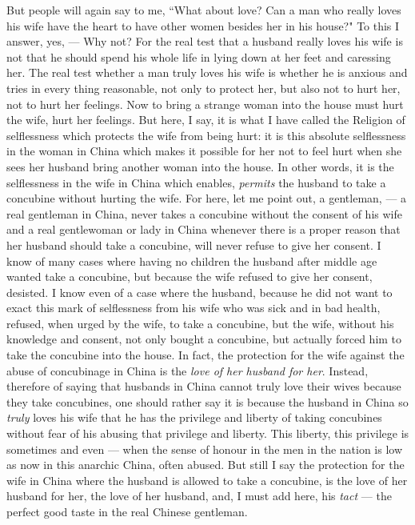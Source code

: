 But people will again say to me, ``What about love? Can a man who really loves his wife have the heart to have other women besides her in his house?"
To this I answer, yes, --- Why not? 
For the real test that a husband really loves his wife is not that he should spend his whole life in lying down at her feet and caressing her.
The real test whether a man truly loves his wife is whether he is anxious and tries in every thing reasonable, not only to protect her, but also not to hurt her, not to hurt her feelings.
Now to bring a strange woman into the house must hurt the wife, hurt her feelings.
But here, I say, it is what I have called the Religion of selflessness which protects the wife from being hurt: it is this absolute selflessness in the woman in China which makes it possible for her not to feel hurt when she sees her husband bring another woman into the house.
In other words, it is the selflessness in the wife in China which enables, \emph{permits} the husband to take a concubine without hurting the wife.
For here, let me point out, a gentleman, --- a real gentleman in China, never takes a concubine without the consent of his wife and a real gentlewoman or lady in China whenever there is a proper reason that her husband should take a concubine, will never refuse to give her consent.
I know of many cases where having no children the husband after middle age wanted take a concubine, but because the wife refused to give her consent, desisted.
I know even of a case where the husband, because he did not want to exact this mark of selflessness from his wife who was sick and in bad health, refused, when urged by the wife, to take a concubine, but the wife, without his knowledge and consent, not only bought a concubine, but actually forced him to take the concubine into the house.
In fact, the protection for the wife against the abuse of concubinage in China is the \emph{love of her husband for her}.
Instead, therefore of saying that husbands in China cannot truly love their wives because they take concubines, one should rather say it is because the husband in China so \emph{truly} loves his wife that he has the privilege and liberty of taking concubines without fear of his abusing that privilege and liberty.
This liberty, this privilege is sometimes and even --- when the sense of honour in the men in the nation is low as now in this anarchic China, often abused.
But still I say the protection for the wife in China where the husband is allowed to take a concubine, is the love of her husband for her, the love of her husband, and, I must add here, his \emph{tact} --- the perfect good taste in the real Chinese gentleman.

